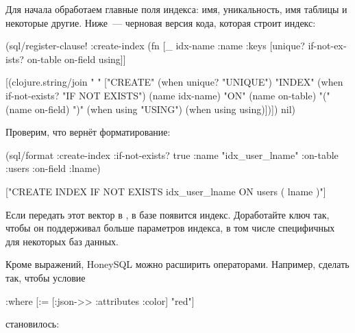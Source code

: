 Для начала обработаем главные поля индекса: имя, уникальность, имя таблицы и некоторые другие. Ниже~--- черновая версия кода, которая строит индекс:

\begin{english}
  \begin{clojure}
(sql/register-clause!
 :create-index
 (fn [_ {idx-name :name
         :keys [unique?
                if-not-exists?
                on-table
                on-field
                using]}]

   [(clojure.string/join
     " "
     ["CREATE"
      (when unique? "UNIQUE")
      "INDEX"
      (when if-not-exists? "IF NOT EXISTS")
      (name idx-name)
      "ON"
      (name on-table)
      "(" (name on-field) ")"
      (when using "USING")
      (when using using)])])
 nil)
  \end{clojure}
\end{english}

Проверим, что вернёт форматирование:

\begin{english}
  \begin{clojure}
(sql/format {:create-index
              {:if-not-exists? true
               :name "idx_user_lname"
               :on-table :users
               :on-field :lname}})

["CREATE INDEX IF NOT EXISTS idx_user_lname
  ON users ( lname )"]
  \end{clojure}
\end{english}

Если передать этот вектор в , в базе появится индекс. Доработайте ключ  так, чтобы он поддерживал больше параметров индекса, в том числе специфичных для некоторых баз данных.

Кроме выражений, HoneySQL можно расширить операторами. Например, сделать так, чтобы условие

\begin{english}
  \begin{clojure}
{:where [:= [:json->> :attributes :color] "red"]}
  \end{clojure}
\end{english}

\noindent
становилось:

\begin{english}
  \begin{clojure}
["... WHERE attributes ->> 'color' = ?" "red"]
  \end{clojure}
\end{english}

